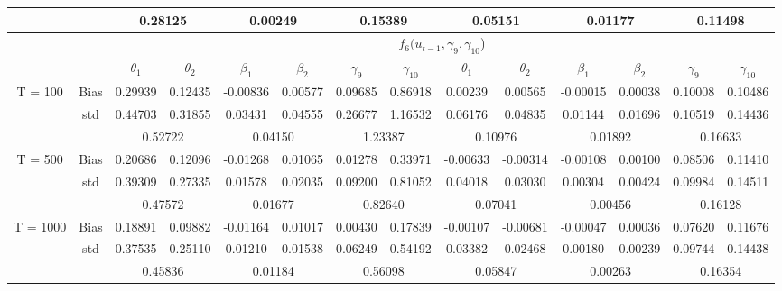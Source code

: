 \documentclass[a4paper,12pt,times,numbered,print,index]{report}
\numberwithin{equation}{section}
\begin{document}
\begin{table}[htbp]
\begin{adjustbox}{max width=\textwidth}
\begin{tabular}{cccccccccccccc}
          &       & \multicolumn{2}{c}{0.28125} & \multicolumn{2}{c}{0.00249} & \multicolumn{2}{c}{0.15389} & \multicolumn{2}{c}{0.05151} & \multicolumn{2}{c}{0.01177} & \multicolumn{2}{c}{0.11498} \\
    \midrule
    &       & \multicolumn{12}{c}{$f_6 (u_{t-1}, \gamma_9, \gamma_{10}$)}                \\
	&       & $\theta_1$ & $\theta_2$ & $\beta_1$ & $\beta_2$ & $\gamma_9$ & $\gamma_{10}$ & $\theta_1$ & $\theta_2$ & $\beta_1$ & $\beta_2$ & $\gamma_9$ & $\gamma_{10}$ \\
    \midrule
    \multirow{3}[1]{*}{T = 100} & Bias  & 0.29939 & 0.12435 & -0.00836 & 0.00577 & 0.09685 & 0.86918 & 0.00239 & 0.00565 & -0.00015 & 0.00038 & 0.10008 & 0.10486 \\
          & std   & 0.44703 & 0.31855 & 0.03431 & 0.04555 & 0.26677 & 1.16532 & 0.06176 & 0.04835 & 0.01144 & 0.01696 & 0.10519 & 0.14436 \\
          &       & \multicolumn{2}{c}{0.52722} & \multicolumn{2}{c}{\textcolor[rgb]{ .329,  .51,  .208}{0.04150}} & \multicolumn{2}{c}{1.23387} & \multicolumn{2}{c}{0.10976} & \multicolumn{2}{c}{\textcolor[rgb]{ .329,  .51,  .208}{0.01892}} & \multicolumn{2}{c}{0.16633} \\
    \multirow{3}[0]{*}{T = 500} & Bias  & 0.20686 & 0.12096 & -0.01268 & 0.01065 & 0.01278 & 0.33971 & -0.00633 & -0.00314 & -0.00108 & 0.00100 & 0.08506 & 0.11410 \\
          & std   & 0.39309 & 0.27335 & 0.01578 & 0.02035 & 0.09200 & 0.81052 & 0.04018 & 0.03030 & 0.00304 & 0.00424 & 0.09984 & 0.14511 \\
          &       & \multicolumn{2}{c}{0.47572} & \multicolumn{2}{c}{\textcolor[rgb]{ .329,  .51,  .208}{0.01677}} & \multicolumn{2}{c}{0.82640} & \multicolumn{2}{c}{0.07041} & \multicolumn{2}{c}{\textcolor[rgb]{ .329,  .51,  .208}{0.00456}} & \multicolumn{2}{c}{0.16128} \\
    \multirow{3}[1]{*}{T = 1000} & Bias  & 0.18891 & 0.09882 & -0.01164 & 0.01017 & 0.00430 & 0.17839 & -0.00107 & -0.00681 & -0.00047 & 0.00036 & 0.07620 & 0.11676 \\
          & std   & 0.37535 & 0.25110 & 0.01210 & 0.01538 & 0.06249 & 0.54192 & 0.03382 & 0.02468 & 0.00180 & 0.00239 & 0.09744 & 0.14438 \\
          &       & \multicolumn{2}{c}{0.45836} & \multicolumn{2}{c}{\textcolor[rgb]{ .329,  .51,  .208}{0.01184}} & \multicolumn{2}{c}{0.56098} & \multicolumn{2}{c}{0.05847} & \multicolumn{2}{c}{\textcolor[rgb]{ .329,  .51,  .208}{0.00263}} & \multicolumn{2}{c}{0.16354} \\
    \bottomrule
    \bottomrule
    \end{tabular}%
    \end{adjustbox}
  \label{s_f56}%
\end{table}%
\end{document}
